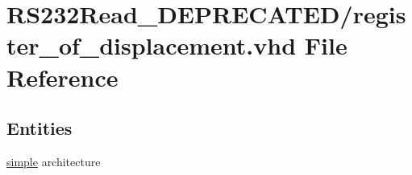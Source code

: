 \hypertarget{register__of__displacement_8vhd}{}\section{R\+S232\+Read\+\_\+\+D\+E\+P\+R\+E\+C\+A\+T\+E\+D/register\+\_\+of\+\_\+displacement.vhd File Reference}
\label{register__of__displacement_8vhd}
\subsection*{Entities}
\begin{DoxyCompactItemize}
\item 
\hyperlink{classregister__of__displacement_1_1simple}{simple} architecture
\end{DoxyCompactItemize}
